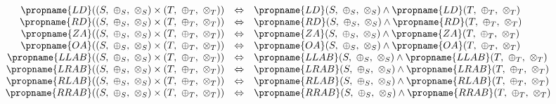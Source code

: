 \[
\begin{array}{rcl} 
\propname{LD}((S,\ \oplus_S,\ \otimes_S) \times (T,\ \oplus_T,\ \otimes_T)) 
   & \Leftrightarrow %
   & \propname{LD}(S,\ \oplus_S,\ \otimes_S) \wedge \propname{LD}(T,\ \oplus_T,\ \otimes_T)\\ 
\propname{RD}((S,\ \oplus_S,\ \otimes_S) \times (T,\ \oplus_T,\ \otimes_T)) 
   & \Leftrightarrow %
   & \propname{RD}(S,\ \oplus_S,\ \otimes_S) \wedge \propname{RD}(T,\ \oplus_T,\ \otimes_T) 
  \\ 
\propname{ZA}((S,\ \oplus_S,\ \otimes_S) \times (T,\ \oplus_T,\ \otimes_T)) 
    & \Leftrightarrow %
    & \propname{ZA}(S,\ \oplus_S,\ \otimes_S) \wedge \propname{ZA}(T,\ \oplus_T,\ \otimes_T)
   \\
\propname{OA}((S,\ \oplus_S,\ \otimes_S) \times (T,\ \oplus_T,\ \otimes_T)) 
    & \Leftrightarrow %
    & \propname{OA}(S,\ \oplus_S,\ \otimes_S) \wedge \propname{OA}(T,\ \oplus_T,\ \otimes_T)
   \\
\propname{LLAB}((S,\ \oplus_S,\ \otimes_S) \times (T,\ \oplus_T,\ \otimes_T)) 
    & \Leftrightarrow %
    & \propname{LLAB}(S,\ \oplus_S,\ \otimes_S) \wedge \propname{LLAB}(T,\ \oplus_T,\ \otimes_T)
    \\
\propname{LRAB}((S,\ \oplus_S,\ \otimes_S) \times (T,\ \oplus_T,\ \otimes_T)) 
    & \Leftrightarrow %
    & \propname{LRAB}(S,\ \oplus_S,\ \otimes_S) \wedge \propname{LRAB}(T,\ \oplus_T,\ \otimes_T)
    \\ 
\propname{RLAB}((S,\ \oplus_S,\ \otimes_S) \times (T,\ \oplus_T,\ \otimes_T)) 
    & \Leftrightarrow %
    & \propname{RLAB}(S,\ \oplus_S,\ \otimes_S) \wedge  \propname{RLAB}(T,\ \oplus_T,\ \otimes_T) 
    \\ 
\propname{RRAB}((S,\ \oplus_S,\ \otimes_S) \times (T,\ \oplus_T,\ \otimes_T)) 
    & \Leftrightarrow %
    & \propname{RRAB}(S,\ \oplus_S,\ \otimes_S) \wedge  \propname{RRAB}(T,\ \oplus_T,\ \otimes_T) 
    \\ 
\end{array} 
\]

